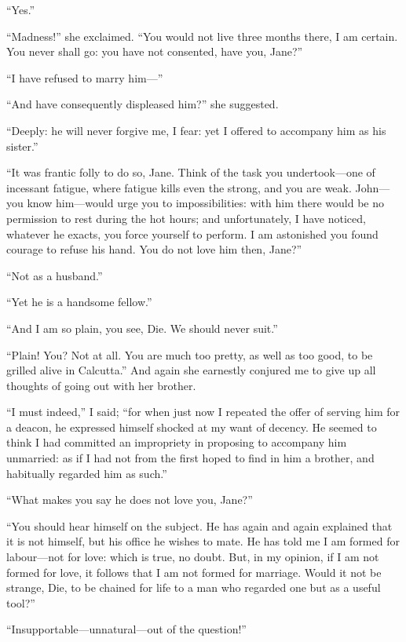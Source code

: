 \enquote{Yes.}

\enquote{Madness!} she exclaimed. \enquote{You would not live three
	months there, I am certain. You never shall go: you have not consented,
	have you, Jane?}

\enquote{I have refused to marry him---}

\enquote{And have consequently displeased him?} she suggested.

\enquote{Deeply: he will never forgive me, I fear: yet I offered to
	accompany him as his sister.}

\enquote{It was frantic folly to do so, Jane. Think of the task you
	undertook---one of incessant fatigue, where fatigue kills even the
	strong, and you are weak. \St{} John---you know him---would urge you to
	impossibilities: with him there would be no permission to rest during
	the hot hours; and unfortunately, I have noticed, whatever he exacts,
	you force yourself to perform. I am astonished you found courage to
	refuse his hand. You do not love him then, Jane?}

\enquote{Not as a husband.}

\enquote{Yet he is a handsome fellow.}

\enquote{And I am so plain, you see, Die. We should never suit.}

\enquote{Plain! You? Not at all. You are much too pretty, as well as
	too good, to be grilled alive in Calcutta.} And again she earnestly
conjured me to give up all thoughts of going out with her brother.

\enquote{I must indeed,} I said; \enquote{for when just now I repeated
	the offer of serving him for a deacon, he expressed himself shocked at
	my want of decency. He seemed to think I had committed an impropriety
	in proposing to accompany him unmarried: as if I had not from the first
	hoped to find in him a brother, and habitually regarded him as such.}

\enquote{What makes you say he does not love you, Jane?}

\enquote{You should hear himself on the subject. He has again and again
	explained that it is not himself, but his office he wishes to mate. He
	has told me I am formed for labour---not for love: which is true, no
	doubt. But, in my opinion, if I am not formed for love, it follows that
	I am not formed for marriage. Would it not be strange, Die, to be
	chained for life to a man who regarded one but as a useful tool?}

\enquote{Insupportable---unnatural---out of the question!}

